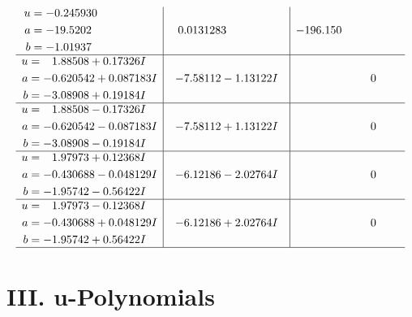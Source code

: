 \documentclass[1p]{elsarticle_modified}
\theoremstyle{definition}
\begin{document}
$$\begin{array}{c|c|c}
\begin{aligned}
u &= -0.245930\phantom{ +0.000000I} \\
a &= -19.5202\phantom{ +0.000000I} \\
b &= -1.01937\phantom{ +0.000000I}\end{aligned}
 & \phantom{-}0.0131283\phantom{ +0.000000I} & -196.150\phantom{ +0.000000I} \\ \hline\begin{aligned}
u &= \phantom{-}1.88508 + 0.17326 I \\
a &= -0.620542 + 0.087183 I \\
b &= -3.08908 + 0.19184 I\end{aligned}
 & -7.58112 - 1.13122 I & \phantom{-0.000000 } 0 \\ \hline\begin{aligned}
u &= \phantom{-}1.88508 - 0.17326 I \\
a &= -0.620542 - 0.087183 I \\
b &= -3.08908 - 0.19184 I\end{aligned}
 & -7.58112 + 1.13122 I & \phantom{-0.000000 } 0 \\ \hline\begin{aligned}
u &= \phantom{-}1.97973 + 0.12368 I \\
a &= -0.430688 - 0.048129 I \\
b &= -1.95742 - 0.56422 I\end{aligned}
 & -6.12186 - 2.02764 I & \phantom{-0.000000 } 0 \\ \hline\begin{aligned}
u &= \phantom{-}1.97973 - 0.12368 I \\
a &= -0.430688 + 0.048129 I \\
b &= -1.95742 + 0.56422 I\end{aligned}
 & -6.12186 + 2.02764 I & \phantom{-0.000000 } 0\\
 \hline 
 \end{array}$$\newpage
\newpage\renewcommand{\arraystretch}{1}
\centering \section*{ III. u-Polynomials}
\end{document}
